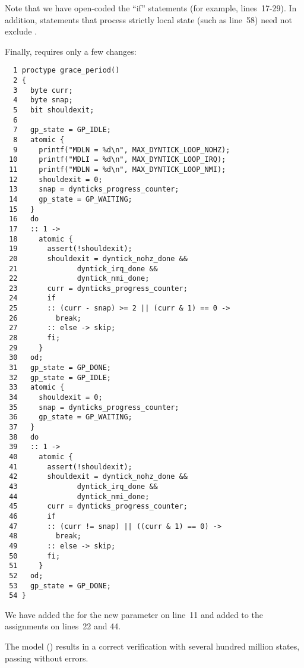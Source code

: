 Note that we have open-coded the ``if'' statements
(for example, lines~17-29).
In addition, statements that process strictly local state
(such as line~58) need not exclude .

Finally,  requires only a few changes:

{ \scriptsize
\begin{verbatim}
  1 proctype grace_period()
  2 {
  3   byte curr;
  4   byte snap;
  5   bit shouldexit;
  6
  7   gp_state = GP_IDLE;
  8   atomic {
  9     printf("MDLN = %d\n", MAX_DYNTICK_LOOP_NOHZ);
 10     printf("MDLI = %d\n", MAX_DYNTICK_LOOP_IRQ);
 11     printf("MDLN = %d\n", MAX_DYNTICK_LOOP_NMI);
 12     shouldexit = 0;
 13     snap = dynticks_progress_counter;
 14     gp_state = GP_WAITING;
 15   }
 16   do
 17   :: 1 ->
 18     atomic {
 19       assert(!shouldexit);
 20       shouldexit = dyntick_nohz_done &&
 21              dyntick_irq_done &&
 22              dyntick_nmi_done;
 23       curr = dynticks_progress_counter;
 24       if
 25       :: (curr - snap) >= 2 || (curr & 1) == 0 ->
 26         break;
 27       :: else -> skip;
 28       fi;
 29     }
 30   od;
 31   gp_state = GP_DONE;
 32   gp_state = GP_IDLE;
 33   atomic {
 34     shouldexit = 0;
 35     snap = dynticks_progress_counter;
 36     gp_state = GP_WAITING;
 37   }
 38   do
 39   :: 1 ->
 40     atomic {
 41       assert(!shouldexit);
 42       shouldexit = dyntick_nohz_done &&
 43              dyntick_irq_done &&
 44              dyntick_nmi_done;
 45       curr = dynticks_progress_counter;
 46       if
 47       :: (curr != snap) || ((curr & 1) == 0) ->
 48         break;
 49       :: else -> skip;
 50       fi;
 51     }
 52   od;
 53   gp_state = GP_DONE;
 54 }
\end{verbatim}
}

We have added the  for the new
 parameter on line~11 and
added  to the 
assignments on lines~22 and 44.

The model ()
results in a correct verification with several hundred million
states, passing without errors.

